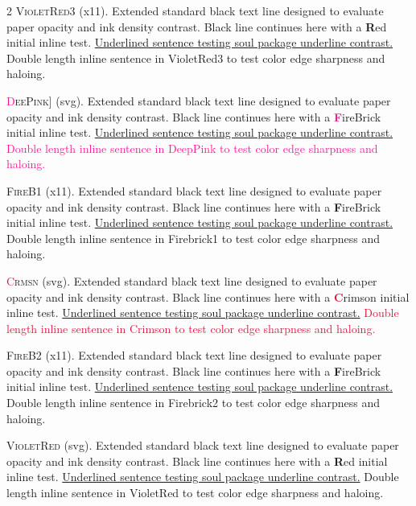 \begin{multicols}{2}
\lettrine[lines=2]{\textcolor{VioletRed3}{V}}{ioletRed3} (x11). Extended standard black text line designed to evaluate paper opacity and ink density contrast. Black line continues here with a \textbf{\textcolor{VioletRed3}{R}}ed initial inline test. \ul{Underlined sentence testing soul package underline contrast.} \textcolor{VioletRed3}{Double length inline sentence in VioletRed3 to test color edge sharpness and haloing.}


\lettrine[lines=2]{\textcolor{DeepPink}{D}}{eePink]} (svg). Extended standard black text line designed to evaluate paper opacity and ink density contrast. Black line continues here with a \textbf{\textcolor{DeepPink}{F}}ireBrick initial inline test. \ul{Underlined sentence testing soul package underline contrast.} \textcolor{DeepPink}{Double length inline sentence in DeepPink to test color edge sharpness and haloing.}


\lettrine[lines=2]{\textcolor{Firebrick1}{F}}{ireB1} (x11). Extended standard black text line designed to evaluate paper opacity and ink density contrast. Black line continues here with a \textbf{\textcolor{Firebrick1}{F}}ireBrick initial inline test. \ul{Underlined sentence testing soul package underline contrast.} \textcolor{Firebrick1}{Double length inline sentence in Firebrick1 to test color edge sharpness and haloing.}


\lettrine[lines=2]{\textcolor{Crimson}{C}}{rmsn} (svg). Extended standard black text line designed to evaluate paper opacity and ink density contrast. Black line continues here with a \textbf{\textcolor{Crimson}{C}}rimson initial inline test. \ul{Underlined sentence testing soul package underline contrast.} \textcolor{Crimson}{Double length inline sentence in Crimson to test color edge sharpness and haloing.}


\lettrine[lines=2]{\textcolor{Firebrick2}{F}}{ireB2} (x11). Extended standard black text line designed to evaluate paper opacity and ink density contrast. Black line continues here with a \textbf{\textcolor{Firebrick2}{F}}ireBrick initial inline test. \ul{Underlined sentence testing soul package underline contrast.} \textcolor{Firebrick2}{Double length inline sentence in Firebrick2 to test color edge sharpness and haloing.}


\lettrine[lines=2]{\textcolor{VioletRed}{V}}{ioletRed} (svg). Extended standard black text line designed to evaluate paper opacity and ink density contrast. Black line continues here with a \textbf{\textcolor{VioletRed}{R}}ed initial inline test. \ul{Underlined sentence testing soul package underline contrast.} \textcolor{VioletRed}{Double length inline sentence in VioletRed to test color edge sharpness and haloing.}



\end{multicols}
